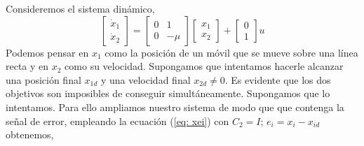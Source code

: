\begin{example} Consideremos el sistema dinámico,
\begin{equation*}
\begin{bmatrix}
\dot x_1 \\
\dot x_2
\end{bmatrix} =
\begin{bmatrix}
0 & 1\\
0 & -\mu
\end{bmatrix} 
\begin{bmatrix}
x_1 \\
x_2
\end{bmatrix}+ 
\begin{bmatrix}
0 \\ 1
\end{bmatrix}u
\end{equation*}
Podemos pensar en $x_1$ como la posición de un móvil que se mueve sobre una línea recta y en $x_2$ como su velocidad. Supongamos que intentamos hacerle alcanzar una posición final $x_{1d}$ y una velocidad final $x_{2d} \neq 0$. Es evidente que los dos objetivos son imposibles de conseguir simultáneamente. Supongamos que lo intentamos. Para ello ampliamos nuestro sistema de modo que que contenga la señal de error, empleando la ecuación (\ref{eq: xei})  con $C_2 = I ;\,  e_i = x_i-x_{id}$ obtenemos,


\end{example}
